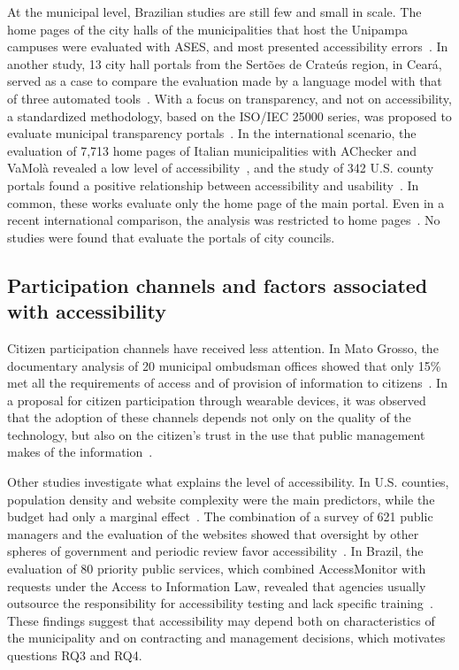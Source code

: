 \documentclass[12pt]{article}
\begin{document}
At the municipal level, Brazilian studies are still few and small in scale. The home pages of the city halls of the municipalities that host the Unipampa campuses were evaluated with ASES, and most presented accessibility errors~\cite{eres}. In another study, 13 city hall portals from the Sertões de Crateús region, in Ceará, served as a case to compare the evaluation made by a language model with that of three automated tools~\cite{franca2025}. With a focus on transparency, and not on accessibility, a standardized methodology, based on the ISO/IEC 25000 series, was proposed to evaluate municipal transparency portals~\cite{sbsiAmorim_Menezes}. In the international scenario, the evaluation of 7,713 home pages of Italian municipalities with AChecker and VaMolà revealed a low level of accessibility~\cite{valtolina2022}, and the study of 342 U.S. county portals found a positive relationship between accessibility and usability~\cite{bai2019}. In common, these works evaluate only the home page of the main portal. Even in a recent international comparison, the analysis was restricted to home pages~\cite{wcge}. No studies were found that evaluate the portals of city councils.

\subsection{Participation channels and factors associated with accessibility}

Citizen participation channels have received less attention. In Mato Grosso, the documentary analysis of 20 municipal ombudsman offices showed that only 15\% met all the requirements of access and of provision of information to citizens~\cite{zahn2023}. In a proposal for citizen participation through wearable devices, it was observed that the adoption of these channels depends not only on the quality of the technology, but also on the citizen's trust in the use that public management makes of the information~\cite{giangareli2026}.

Other studies investigate what explains the level of accessibility. In U.S. counties, population density and website complexity were the main predictors, while the budget had only a marginal effect~\cite{bai2021}. The combination of a survey of 621 public managers and the evaluation of the websites showed that oversight by other spheres of government and periodic review favor accessibility~\cite{frandell2026}. In Brazil, the evaluation of 80 priority public services, which combined AccessMonitor with requests under the Access to Information Law, revealed that agencies usually outsource the responsibility for accessibility testing and lack specific training~\cite{nunes2025}. These findings suggest that accessibility may depend both on characteristics of the municipality and on contracting and management decisions, which motivates questions RQ3 and RQ4.
\end{document}
